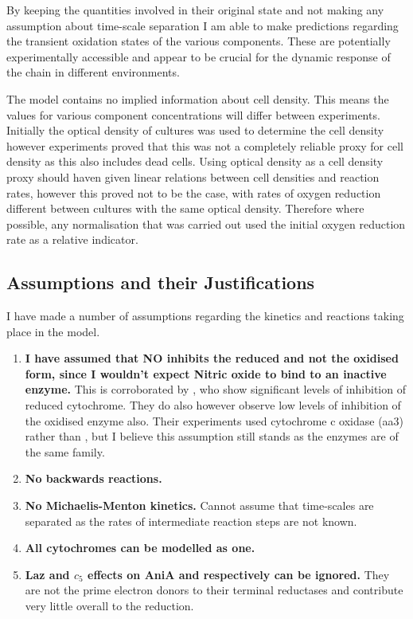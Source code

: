 By keeping the quantities involved in their original state and not making any assumption about time-scale separation I am able to make predictions regarding the transient oxidation states of the various components. These are potentially experimentally accessible and appear to be crucial for the dynamic response of the chain in different environments.

The model contains no implied information about cell density. This means the values for various component concentrations will differ between experiments. Initially the optical density of cultures was used to determine the cell density however experiments proved that this was not a completely reliable proxy for cell density as this also includes dead cells. Using optical density as a cell density proxy should haven given linear relations between cell densities and reaction rates, however this proved not to be the case, with rates of oxygen reduction different between cultures with the same optical density. Therefore where possible, any normalisation that was carried out used the initial oxygen reduction rate as a relative indicator.

\subsection{Assumptions and their Justifications}
I have made a number of assumptions regarding the kinetics and reactions taking place in the model.
\begin{enumerate}
 \item {\bf I have assumed that NO inhibits the reduced \cbbthree{} and not the oxidised form, since I wouldn't expect Nitric oxide to bind to an inactive enzyme.} This is corroborated by \citet{Giuffre2000}, who show significant levels of inhibition of reduced cytochrome. They do also however observe low levels of inhibition of the oxidised enzyme also. Their experiments used cytochrome c oxidase (aa3) rather than \cbbthree{}, but I believe this assumption still stands as the enzymes are of the same family.
 \item {\bf No backwards reactions.}
 \item {\bf No Michaelis-Menton kinetics.} Cannot assume that time-scales are separated as the rates of intermediate reaction steps are not known.
 \item {\bf All cytochromes can be modelled as one.}
 \item {\bf Laz and $c_5$ effects on AniA and \cbbthree{} respectively can be ignored.} They are not the prime electron donors to their terminal reductases and contribute very little overall to the reduction\cite{Deeudom2007}.
\end{enumerate}


